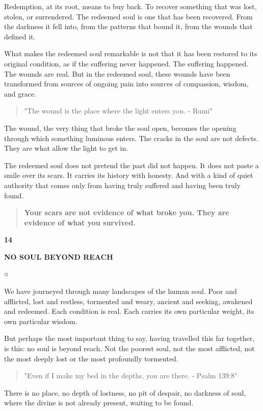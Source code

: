 Redemption, at its root, means to buy back. To recover something that
was lost, stolen, or surrendered. The redeemed soul is one that has been
recovered. From the darkness it fell into, from the patterns that bound
it, from the wounds that defined it.

What makes the redeemed soul remarkable is not that it has been restored
to its original condition, as if the suffering never happened. The
suffering happened. The wounds are real. But in the redeemed soul, these
wounds have been transformed from sources of ongoing pain into sources
of compassion, wisdom, and grace.

\begin{quote}
"The wound is the place where the light enters you. - Rumi"
\end{quote}

The wound, the very thing that broke the soul open, becomes the opening
through which something luminous enters. The cracks in the soul are not
defects. They are what allow the light to get in.

The redeemed soul does not pretend the past did not happen. It does not
paste a smile over its scars. It carries its history with honesty. And
with a kind of quiet authority that comes only from having truly
suffered and having been truly found.

\begin{quote}
\textbf{Your scars are not evidence of what broke you. They are evidence
of what you survived.}
\end{quote}

\textbf{14}

\textbf{NO SOUL BEYOND REACH}

○

We have journeyed through many landscapes of the human soul. Poor and
afflicted, lost and restless, tormented and weary, ancient and seeking,
awakened and redeemed. Each condition is real. Each carries its own
particular weight, its own particular wisdom.

But perhaps the most important thing to say, having travelled this far
together, is this: no soul is beyond reach. Not the poorest soul, not
the most afflicted, not the most deeply lost or the most profoundly
tormented.

\begin{quote}
"Even if I make my bed in the depths, you are there. - Psalm 139:8"
\end{quote}

There is no place, no depth of lostness, no pit of despair, no darkness
of soul, where the divine is not already present, waiting to be found.


